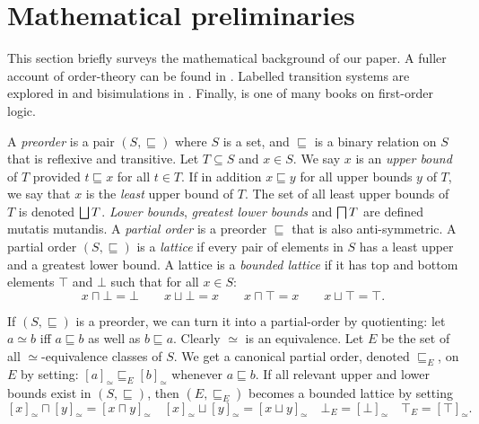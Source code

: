 \section{Mathematical preliminaries}\label{preliminaries}

\NI This section briefly surveys the mathematical background of our
paper.  A fuller account of order-theory can be found in
\cite{DaveyBA:intlatao}.  Labelled transition systems are explored in
\cite{HennessyM:Algtheop,SassoneV:modcontac} and bisimulations in
\cite{SangiorgiD:intbisac}. Finally, \cite{EndertonHB:matinttl} is one
of many books on first-order logic.

A \emph{preorder} is a pair $(S, \sqsubseteq)$ where $S$ is a set, and
$\sqsubseteq$ is a binary relation on $S$ that is reflexive and
transitive. Let $T \subseteq S$ and $x \in S$. We say $x$ is an
\emph{upper bound} of $T$ provided $t \sqsubseteq x$ for all $t \in
T$. If in addition $x \sqsubseteq y$ for all upper bounds $y$ of $T$,
we say that $x$ is the \emph{least} upper bound of $T$.  The set of
all least upper bounds of $T$ is denoted $\bigsqcup T$.  \emph{Lower
  bounds}, \emph{greatest lower bounds} and $\bigsqcap T$ are defined
mutatis mutandis.  A \emph{partial order} is a preorder $\sqsubseteq$
that is also anti-symmetric.  A partial order $(S, \sqsubseteq)$ is a
\emph{lattice} if every pair of elements in $S$ has a least upper and
a greatest lower bound.  A lattice is a \emph{bounded lattice} if it
has top and bottom elements $\top$ and $\bot$ such that for all $x \in
S$:
\[
x \sqcap \bot = \bot \nonumber \qquad
x \sqcup \bot = x \nonumber \qquad
x \sqcap \top = x \nonumber \qquad
x \sqcup \top = \top \nonumber.
\]

\NI If $(S, \sqsubseteq)$ is a preorder, we can turn it into a
partial-order by quotienting: let $a \simeq b$ iff $a \sqsubseteq b$
as well as $b \sqsubseteq a$. Clearly $\simeq$ is an equivalence. Let
$E$ be the set of all $\simeq$-equivalence classes of $S$. We get a
canonical partial order, denoted $\sqsubseteq_E$, on $E$ by setting:
$[a]_{\simeq} \sqsubseteq_E [b]_{\simeq}$ whenever $a \sqsubseteq
b$. If all relevant upper and lower bounds exist in $(S,
\sqsubseteq)$, then $(E, \sqsubseteq_E)$ becomes a bounded lattice by
setting
\[
   [x]_{\simeq} \sqcap [y]_{\simeq} = [ x \sqcap y ]_{\simeq}
       \quad
   [x]_{\simeq} \sqcup [y]_{\simeq} = [ x \sqcup y ]_{\simeq}
       \quad
   \bot_{E} = [\bot]_{\simeq}
       \quad
   \top_{E} = [\top]_{\simeq}.
\]


